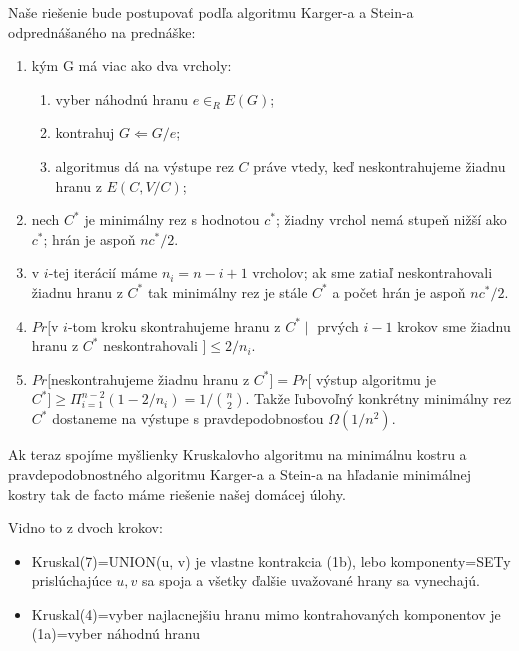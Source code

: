 \documentclass[12pt,a4paper]{article}
\begin{document}
Naše riešenie bude postupovať podľa algoritmu Karger-a a Stein-a odprednášaného na prednáške: 
\begin{enumerate} 
\item kým G má viac ako dva vrcholy: 
  \begin{enumerate} 
  \item vyber náhodnú hranu $e \in_R E(G)$; 
  \item kontrahuj $G \Leftarrow G/e$; 
  \item algoritmus dá na výstupe rez $C$ práve vtedy, keď neskontrahujeme žiadnu hranu z $E(C, V/C)$; 
  \end{enumerate} 

\item nech $C^*$ je minimálny rez s hodnotou $c^*$; žiadny vrchol nemá stupeň nižší ako $c^*$; hrán je aspoň $nc^*/2$.
\item v $i$-tej iterácií máme $n_i = n - i + 1$ vrcholov; 
ak sme zatiaľ neskontrahovali žiadnu hranu z $C^*$ 
tak minimálny rez je stále $C^*$ a počet hrán je aspoň $nc^*/2$. 
\item $Pr[$v $i$-tom kroku skontrahujeme hranu z $C^* \mid $ prvých $i - 1$ krokov sme žiadnu hranu z $C^*$ neskontrahovali $] \leq 2 / n_i$.  
\item $Pr[$neskontrahujeme žiadnu hranu z $C^*] = Pr[$ výstup algoritmu je $C^*] \geq \Pi_{i=1}^{n-2} (1 - 2/n_i) = 1 / \binom{n}{2}$. Takže ľubovoľný konkrétny minimálny rez $C^*$ dostaneme na výstupe s pravdepodobnosťou $\Omega(1/n^2)$.
\end{enumerate} 

Ak teraz spojíme myšlienky Kruskalovho algoritmu na minimálnu kostru a pravdepodobnostného algoritmu Karger-a a Stein-a na hľadanie minimálnej kostry tak de facto máme riešenie našej domácej úlohy. 

Vidno to z dvoch krokov: 
\begin{itemize}
\item Kruskal(7)=UNION(u, v) je vlastne kontrakcia (1b), lebo komponenty=SETy prislúchajúce $u,v$ sa spoja a všetky ďalšie uvažované hrany sa vynechajú. 
\item Kruskal(4)=vyber najlacnejšiu hranu mimo kontrahovaných komponentov je (1a)=vyber náhodnú hranu
\end{itemize} 
\end{document}
